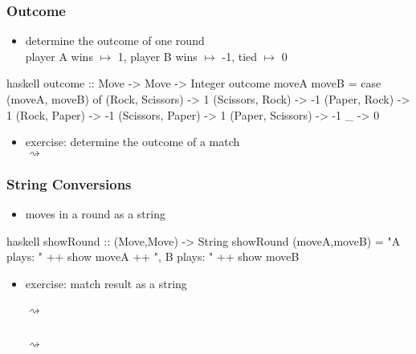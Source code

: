 \documentclass[dvipsnames]{beamer}
\theoremstyle{plain}
\begin{document}
\begin{frame}[fragile]
  \frametitle{Outcome}

  \begin{itemize}
    \item determine the outcome of one round\\
      player A wins $\mapsto$ 1, player B wins $\mapsto$ -1, tied $\mapsto$ 0
  \end{itemize}

  \begin{exampleblock}{}
    \begin{pygments}{haskell}
outcome :: Move -> Move -> Integer
outcome moveA moveB =
    case (moveA, moveB) of
      (Rock,     Scissors) ->  1
      (Scissors, Rock)     -> -1
      (Paper,    Rock)     ->  1
      (Rock,     Paper)    -> -1
      (Scissors, Paper)    ->  1
      (Paper,    Scissors) -> -1
      _                    ->  0
    \end{pygments}
  \end{exampleblock}

  \begin{itemize}
    \item exercise: determine the outcome of a match\\
      $\rightsquigarrow$ 
  \end{itemize}
\end{frame}

\begin{frame}[fragile]
  \frametitle{String Conversions}

  \begin{itemize}
    \item moves in a round as a string
  \end{itemize}

  \begin{exampleblock}{}
    \begin{pygments}{haskell}
showRound :: (Move,Move) -> String
showRound (moveA,moveB) =
    "A plays: " ++ show moveA ++
    ", B plays: " ++ show moveB
    \end{pygments}
  \end{exampleblock}

  \begin{itemize}
    \item exercise: match result as a string\\
      \\
      $\rightsquigarrow$ 

      \smallskip
      \\
      $\rightsquigarrow$ 
  \end{itemize}
\end{frame}
\end{document}
